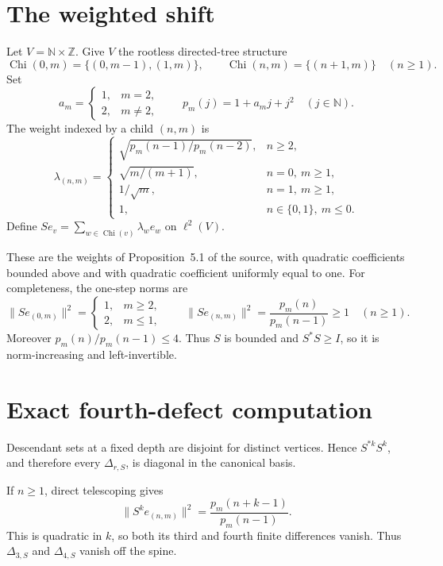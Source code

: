 \documentclass[10pt]{article}
\newcommand{\N}{\mathbb N}
\newcommand{\Z}{\mathbb Z}
\begin{document}
\section{The weighted shift}
Let $V=\N\times\Z$.  Give $V$ the rootless directed-tree structure
\[
 \operatorname{Chi}(0,m)=\{(0,m-1),(1,m)\},\qquad
 \operatorname{Chi}(n,m)=\{(n+1,m)\}\quad(n\geq1).
\]
Set
\[
 a_m=\begin{cases}1,&m=2,\\2,&m\ne2,\end{cases}
 \qquad p_m(j)=1+a_mj+j^2\quad(j\in\N).
\]
The weight indexed by a child $(n,m)$ is
\[
 \lambda_{(n,m)}=
 \begin{cases}
 \sqrt{p_m(n-1)/p_m(n-2)},&n\geq2,\\
 \sqrt{m/(m+1)},&n=0,\ m\geq1,\\
 1/\sqrt m,&n=1,\ m\geq1,\\
 1,&n\in\{0,1\},\ m\leq0.
 \end{cases}
\]
Define $Se_v=\sum_{w\in\operatorname{Chi}(v)}\lambda_we_w$ on
$\ell^2(V)$.

These are the weights of Proposition~5.1 of the source, with quadratic
coefficients bounded above and with quadratic coefficient uniformly equal to
one.  For completeness, the one-step norms are
\[
 \|Se_{(0,m)}\|^2=\begin{cases}1,&m\geq2,\\2,&m\leq1,
 \end{cases}
 \qquad
 \|Se_{(n,m)}\|^2=\frac{p_m(n)}{p_m(n-1)}\geq1\quad(n\geq1).
\]
Moreover $p_m(n)/p_m(n-1)\leq4$.  Thus $S$ is bounded and
$S^*S\geq I$, so it is norm-increasing and left-invertible.

\section{Exact fourth-defect computation}
Descendant sets at a fixed depth are disjoint for distinct vertices.  Hence
$S^{*k}S^k$, and therefore every $\Delta_{r,S}$, is diagonal in the canonical
basis.

If $n\geq1$, direct telescoping gives
\[
 \|S^ke_{(n,m)}\|^2=\frac{p_m(n+k-1)}{p_m(n-1)}.
\]
This is quadratic in $k$, so both its third and fourth finite differences
vanish.  Thus $\Delta_{3,S}$ and $\Delta_{4,S}$ vanish off the spine.
\end{document}
